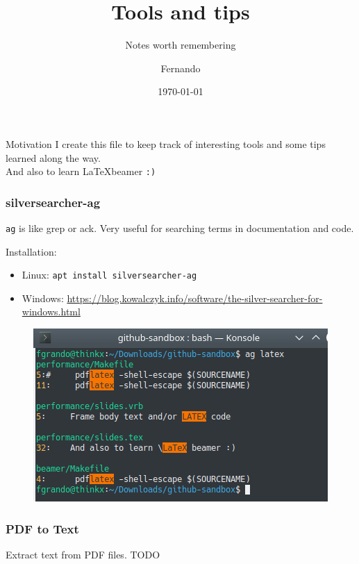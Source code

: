 \documentclass[pdf]{beamer}
\title{Tools and tips}
\subtitle{Notes worth remembering}
\author{Fernando}
\institute{\href{https://github.com/fgrando}{\emph{my github}}}
\date{\today}
\newcommand{\code}[1]{\colorbox{light-gray}{\texttt{#1}}}
\newcommand{\mono}[1]{\texttt{#1}}
\begin{document}
\begin{frame}
    \titlepage
\end{frame}


\begin{frame}{Motivation}
    I create this file to keep track of interesting tools and some tips learned
    along the way.\\
    And also to learn \LaTeX  beamer \mono{:)}
\end{frame}


\begin{frame}
  \frametitle{silversearcher-ag}
  \code{ag} is like grep or ack. Very useful for searching terms in documentation and code.
  
  Installation:
  \begin{itemize}
    \item Linux: \mono{apt install silversearcher-ag}
    \item Windows: \url{https://blog.kowalczyk.info/software/the-silver-searcher-for-windows.html}
  \end{itemize}
  
  \begin{figure}
    \includegraphics[scale=0.4]{data/ag-terminal-linuxpng.png}
  \end{figure}
  

\end{frame}


\begin{frame}
  \frametitle{PDF to Text}
  Extract text from PDF files.
  TODO
\end{frame}
\end{document}
